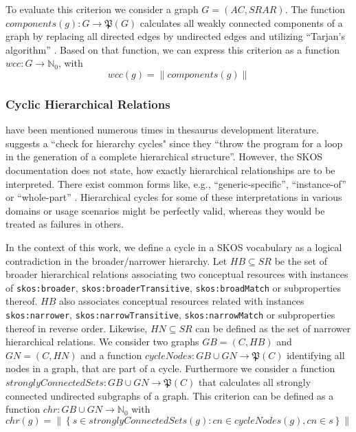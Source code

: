 \begin{definition}
To evaluate this criterion we consider a graph \(G = (AC, SRAR)\). The function \(components(g) : G \rightarrow  \mathfrak{P}(G)\) calculates all weakly connected components of a graph by replacing all directed edges by undirected edges and utilizing “Tarjan’s algorithm” \cite{Hopcroft1973}. Based on that function, we can express this criterion as a function \(wcc : G \rightarrow \mathbb{N}_{0}\), with \[wcc(g) = \left\|components(g)\right\|\]
\end{definition}

\subsubsection{Cyclic Hierarchical Relations} have been mentioned numerous times in thesaurus development literature. \cite{Soergel2002} suggests a ``check for hierarchy cycles" since they ``throw the program for a loop in the generation of a complete hierarchical structure”. However, the SKOS documentation does not state, how exactly hierarchical relationships are to be interpreted. There exist common forms like, e.g., “generic-specific”, “instance-of” or “whole-part” \cite{Hedden2010,Harpring2010,Aitchison2000}. Hierarchical cycles for some of these interpretations in various domains or usage scenarios might be perfectly valid, whereas they would be treated as failures in others.

\begin{definition}
In the context of this work, we define a cycle in a SKOS vocabulary as a logical contradiction in the broader/narrower hierarchy. Let \(HB \subseteq SR\) be the set of broader hierarchical relations associating two conceptual resources with instances of \texttt{skos:broader}, \texttt{skos:broaderTransitive}, \texttt{skos:broadMatch} or subproperties thereof. \(HB\) also associates conceptual resources related with instances \texttt{skos:narrower}, \texttt{skos:narrowTransitive}, \texttt{skos:narrowMatch} or subproperties thereof in reverse order. Likewise, \(HN \subseteq SR\) can be defined as the set of narrower hierarchical relations. We consider two graphs \(GB = (C,HB)\) and \(GN=(C,HN)\) and a function \(cycleNodes:GB \cup GN \rightarrow \mathfrak{P}(C)\) identifying all nodes in a graph, that are part of a cycle. Furthermore we consider a function \(stronglyConnectedSets: GB \cup GN \rightarrow \mathfrak{P}(C)\) that calculates all strongly connected undirected subgraphs of a graph. This criterion can be defined as a function \(chr:GB \cup GN \rightarrow \mathbb{N}_{0}\) with \[chr(g)=\left\|\left\{s \in stronglyConnectedSets(g) : cn \in cycleNodes(g), cn \in s\right\}\right\|\]
\end{definition}

